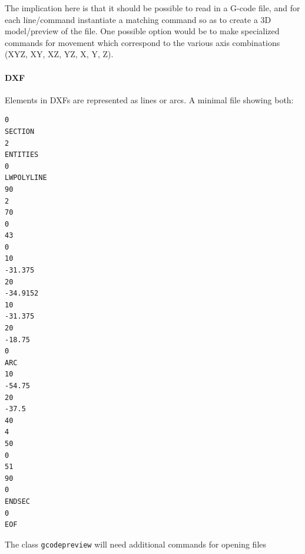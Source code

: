 \documentclass{ltxdoc}
\begin{document}
The implication here is that it should be possible to read in a G-code file, and for each line/\allowbreak command instantiate a matching command so as to create a 3D model/preview  of the file. One possible option would be to make specialized commands for movement which correspond to the various axis combinations (XYZ, XY, XZ, YZ, X, Y, Z).

\paragraph{DXF}

Elements in DXFs are represented as lines or arcs. A minimal file showing both:

\begin{verbatim}
0
SECTION
2
ENTITIES
0
LWPOLYLINE
90
2
70
0
43
0
10
-31.375
20
-34.9152
10
-31.375
20
-18.75
0
ARC
10
-54.75
20
-37.5
40
4
50
0
51
90
0
ENDSEC
0
EOF
\end{verbatim}

The class \verb|gcodepreview| will need additional commands for opening files
\end{document}

